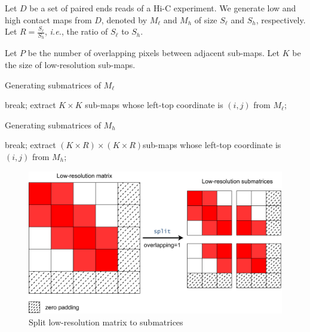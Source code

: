 \documentclass[a4paper,12pt]{article}
\begin{document}
Let $D$ be a set of paired ends reads of a Hi-C experiment. 
We generate low and high contact maps from $D$, 
denoted by $M_\ell$ and $M_h$ of size $S_\ell$ and $S_h$, respectively.  
Let $R = \frac{S_\ell}{S_h}$, \textit{i.e.}, 
the ratio of $S_\ell$ to $S_h$.  

Let $P$ be the number of overlapping pixels between adjacent sub-maps.
Let $K$ be the size of low-resolution sub-maps.

\begin{algorithm}[htbp]
\caption{Generating submatrices of $M_\ell$}
\begin{algorithmic}
                \STATE break;
            \ELSE 
                \STATE extract $K \times K$ sub-maps whose left-top coordinate is $(i,j)$ from $M_\ell$;
            \ENDIF    
        \ENDFOR
    \ENDFOR
\end{algorithmic}
\end{algorithm}

\begin{algorithm}[htbp]
\caption{Generating submatrices of $M_h$}
\begin{algorithmic}
                \STATE break; 
            \ELSE 
                \STATE extract $(K \times R) \times (K \times R)$sub-maps whose left-top coordinate is $(i,j)$ from $M_h$;
            \ENDIF
        \ENDFOR
    \ENDFOR    
\end{algorithmic}
\end{algorithm}

\begin{figure}[htbp]
\centering
\includegraphics[scale=0.03]{figures/lowres_split.png}
\caption{Split low-resolution matrix to submatrices}
\label{low-res to submatrices}
\end{figure}
\end{document}
